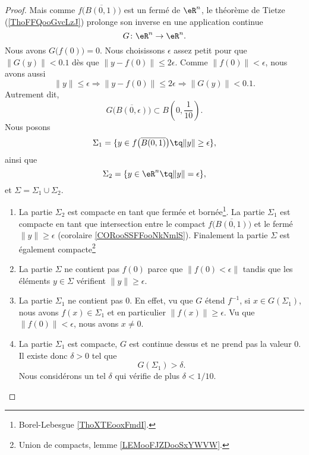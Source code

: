 \begin{proof}
	Mais comme \( f\big( \overline{B(0,1)} \big)\) est un fermé de \( \eR^n\), le théorème de Tietze (\ref{ThoFFQooGvcLzJ}) prolonge son inverse en une application continue
	\begin{equation}
		G \colon \eR^n\to \eR^n.
	\end{equation}
	Nous avons \( G\big( f(0) \big)=0\). Nous choisissons \( \epsilon\) assez petit pour que \( \| G(y) \|<0.1\) dès que \( \| y-f(0) \|\leq 2\epsilon\). Comme \( \| f(0) \|<\epsilon\), nous avons aussi
	\begin{equation}
		\| y \|\leq \epsilon \Rightarrow \| y-f(0) \|\leq 2\epsilon \Rightarrow \| G(y) \|<0.1.
	\end{equation}
	Autrement dit,
	\begin{equation}
		G\Big( \overline{B(0,\epsilon)} \Big)\subset B(0,\frac{1}{ 10}).
	\end{equation}
	Nous posons
	\begin{equation}
		\Sigma_1=\{ y\in f\big( \overline{B(0,1)} \big)\tq \| y \|\geq \epsilon \},
	\end{equation}
	ainsi que
	\begin{equation}
		\Sigma_2=\{ y\in \eR^n\tq \| y \|=\epsilon \},
	\end{equation}
	et \( \Sigma=\Sigma_1\cup \Sigma_2\).

	\begin{enumerate}
		\item

		      La partie \( \Sigma_2\) est compacte en tant que fermée et bornée\footnote{Borel-Lebesgue \ref{ThoXTEooxFmdI}.}. La partie \( \Sigma_1\) est compacte en tant que intersection entre le compact \( f\big( \overline{B(0,1)} \big)\) et le fermé \( \| y \|\geq \epsilon\) (corolaire \ref{CORooSSFFooNkNmlS}). Finalement la partie \( \Sigma\) est également compacte\footnote{Union de compacts, lemme \ref{LEMooFJZDooSxYWVW}.}
		\item
		      La partie \( \Sigma\) ne contient pas \( f(0)\) parce que \( \| f(0)<\epsilon \|\) tandis que les éléments \( y\in \Sigma\) vérifient \( \| y \|\geq \epsilon\).

		\item
		      La partie \( \Sigma_1\) ne contient pas \( 0\). En effet, vu que \( G\) étend \( f^{-1}\), si \( x\in G(\Sigma_1)\), nous avons \( f(x)\in \Sigma_1\) et en particulier \( \| f(x) \|\geq \epsilon\). Vu que \( \| f(0) \|<\epsilon\), nous avons \( x\neq 0\).

		\item
		      La partie \( \Sigma_1\) est compacte, \( G\) est continue dessus et ne prend pas la valeur \( 0\). Il existe donc \( \delta>0\) tel que
		      \begin{equation}
			      G(\Sigma_1)>\delta.
		      \end{equation}
		      Nous considérons un tel \( \delta\) qui vérifie de plus \( \delta<1/10\).
	\end{enumerate}


\end{proof}
